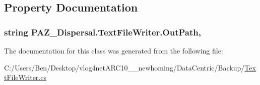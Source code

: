 \subsection{Property Documentation}
\hypertarget{class_p_a_z___dispersal_1_1_text_file_writer_ab3e5afc80e4d8f49e853f3afd7f1a667}{
\subsubsection[{Out\-Path}]{\setlength{\rightskip}{0pt plus 5cm}string P\-A\-Z\-\_\-\-Dispersal.\-Text\-File\-Writer.\-Out\-Path\hspace{0.3cm}{\ttfamily [get]}, {\ttfamily [set]}}}\label{class_p_a_z___dispersal_1_1_text_file_writer_ab3e5afc80e4d8f49e853f3afd7f1a667}


The documentation for this class was generated from the following file\-:\begin{DoxyCompactItemize}
\item 
C\-:/\-Users/\-Ben/\-Desktop/vlog4net\-A\-R\-C10\-\_\-\_\-newhoming/\-Data\-Centric/\-Backup/\hyperlink{_backup_2_text_file_writer_8cs}{Text\-File\-Writer.\-cs}\end{DoxyCompactItemize}
